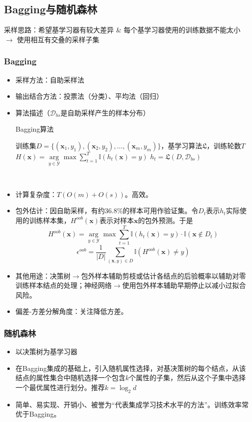 \documentclass{ctexart}
\begin{document}
				\subsection{Bagging与随机森林}
					 
					 采样思路：希望基学习器有较大差异 \& 每个基学习器使用的训练数据不能太小 $\rightarrow$ 使用相互有交叠的采样子集
					 
					 \subsubsection{Bagging}
					 	\begin{itemize}
					 		\item 采样方法：自助采样法
					 		\item 输出结合方法：投票法（分类）、平均法（回归）
					 		\item 算法描述（$\mathcal{D}_{bs}$是自助采样产生的样本分布）\begin{algorithm}
					 			\caption{Bagging算法}
					 			\begin{algorithmic}[1]
					 				\REQUIRE 训练集$D=\{(\bm{x}_1,y_1),(\bm{x}_2,y_2),\dots,(\bm{x}_m,y_m)\}$，基学习算法$\mathfrak{L}$，训练轮数$T$
					 				\ENSURE $H(\bm{x})=\arg\limits_{y\in\mathcal{Y}}\max\sum_{t=1}^{T}\mathbb{I}(h_t(\bm{x})=y)$
					 					\STATE $h_t=\mathfrak{L}(D,\mathcal{D}_{bs})$\\
					 				\ENDFOR
					 			\end{algorithmic} 
					 		\end{algorithm}
				 			\item 计算复杂度：$T(O(m)+O(s))$。高效。
				 			\item 包外估计：因自助采样，有约36.8\%的样本可用作验证集。令$D_t$表示$h_t$实际使用的训练样本集，$H^{oob}(\bm{x})$表示对样本$\bm{x}$的包外预测。于是\[H^{oob}(\bm{x})=\arg\limits_{y\in\mathcal{Y}}\max\sum_{t=1}^{T}\mathbb{I}(h_t(\bm{x})=y)\cdot\mathbb{I}(\bm{x}\notin D_t)\]\[\epsilon^{oob}=\frac{1}{|D|}\sum_{(\bm{x},y)\in D}^{}\mathbb{I}(H^{oob}(\bm{x})\neq y)\]
				 			\item 其他用途：决策树$\rightarrow$包外样本辅助剪枝或估计各结点的后验概率以辅助对零训练样本结点的处理；神经网络$\rightarrow$使用包外样本辅助早期停止以减小过拟合风险。
				 			\item 偏差-方差分解角度：关注降低方差。
					 	\end{itemize}
				 	\subsubsection{随机森林}
				 		\begin{itemize}
				 			\item 以决策树为基学习器
				 			\item 在Bagging集成的基础上，引入随机属性选择，对基决策树的每个结点，从该结点的属性集合中随机选择一个包含$k$个属性的子集，然后从这个子集中选择一个最优属性进行划分。推荐$k=\log_2d$
				 			\item 简单、易实现、开销小、被誉为``代表集成学习技术水平的方法''。训练效率常优于Bagging。
				 		\end{itemize}
\end{document}
